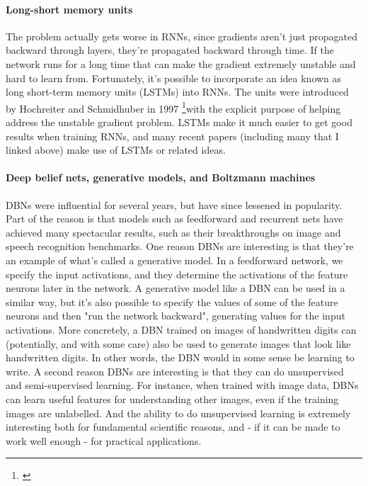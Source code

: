 \documentclass[12pt, letterpaper]{article}
\theoremstyle{definition}
\let\tb\textbf
\begin{document}
\paragraph{\tb{Long-short memory units}} The problem actually gets worse in RNNs, since gradients aren't just propagated backward through layers, they're propagated backward through time. If the network runs for a long time that can make the gradient extremely unstable and hard to learn from. Fortunately, it's possible to incorporate an idea known as long short-term memory units (LSTMs) into RNNs. The units were introduced by Hochreiter and Schmidhuber in 1997 \footnote{\href{http://dx.doi.org/10.1162/neco.1997.9.8.1735}{}}with the explicit purpose of helping address the unstable gradient problem. LSTMs make it much easier to get good results when training RNNs, and many recent papers (including many that I linked above) make use of LSTMs or related ideas.
\paragraph{\tb{Deep belief nets, generative models, and Boltzmann machines}} DBNs were influential for several years, but have since lessened in popularity. Part of the reason is that models such as feedforward and recurrent nets have achieved many spectacular results, such as their breakthroughs on image and speech recognition benchmarks. One reason DBNs are interesting is that they're an example of what's called a generative model. In a feedforward network, we specify the input activations, and they determine the activations of the feature neurons later in the network. A generative model like a DBN can be used in a similar way, but it's also possible to specify the values of some of the feature neurons and then "run the network backward", generating values for the input activations. More concretely, a DBN trained on images of handwritten digits can (potentially, and with some care) also be used to generate images that look like handwritten digits. In other words, the DBN would in some sense be learning to write. A second reason DBNs are interesting is that they can do unsupervised and semi-supervised learning. For instance, when trained with image data, DBNs can learn useful features for understanding other images, even if the training images are unlabelled. And the ability to do unsupervised learning is extremely interesting both for fundamental scientific reasons, and - if it can be made to work well enough - for practical applications.

\newpage
\end{document}
